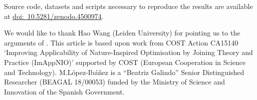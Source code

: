 \documentclass[sigconf,dvipsnames]{acmart}
\newcommand{\supplement}{\href{http://doi.org/10.5281/zenodo.4500974}{doi:~10.5281/zenodo.4500974}}
\begin{document}

 Source code, datasets and scripts necessary to reproduce the results are available at \supplement.
\begin{acks}
We would like to thank Hao Wang (Leiden University) for pointing us to the arguments of
\citep{EriPeaGar2019scalable}.
%
This article is based upon work from COST Action CA15140 `Improving Applicability of Nature-Inspired Optimisation by Joining Theory and Practice (ImAppNIO)' supported by COST (European Cooperation in Science and Technology).
%
M.\@ L\'opez-Ib\'a\~nez is a ``Beatriz Galindo'' Senior Distinguished Researcher (BEAGAL 18/00053) funded by the Ministry of Science and Innovation of the Spanish Government. 
\end{acks}



\end{document}
